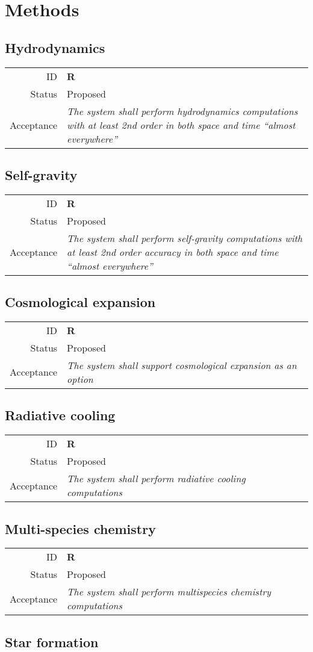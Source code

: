 \documentclass{book}
\newcommand{\req}[3]{
\begin{tabular}{rl}
ID & \textbf{R#1} \\
Status & \textsf{#2} \\
Acceptance & \textit{#3}
\end{tabular}
}
\begin{document}
\section{Methods}

\subsection{Hydrodynamics}

\req
  {}
  {Proposed}
%
  {The system shall perform hydrodynamics computations with at least
  2nd order in both space and time ``almost everywhere''}
\subsection{Self-gravity}

\req
  {}
  {Proposed}
%
  {The system shall perform self-gravity computations with at least
  2nd order accuracy in both space and time ``almost everywhere''}
\subsection{Cosmological expansion}

\req
  {}
  {Proposed}
%
  {The system shall support cosmological expansion as an option}

\subsection{Radiative cooling}

\req
  {}
  {Proposed}
%
  {The system shall perform radiative cooling computations}
\subsection{Multi-species chemistry}

\req
  {}
  {Proposed}
%
  {The system shall perform multispecies chemistry computations}
\subsection{Star formation}
\end{document}
